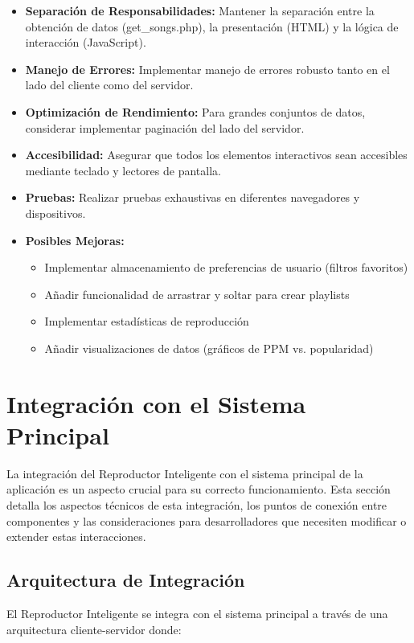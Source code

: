 \documentclass[a4paper,12pt]{article}
\begin{document}
\begin{itemize}
    \item \textbf{Separación de Responsabilidades:} Mantener la separación entre la obtención de datos (get\_songs.php), la presentación (HTML) y la lógica de interacción (JavaScript).
    
    \item \textbf{Manejo de Errores:} Implementar manejo de errores robusto tanto en el lado del cliente como del servidor.
    
    \item \textbf{Optimización de Rendimiento:} Para grandes conjuntos de datos, considerar implementar paginación del lado del servidor.
    
    \item \textbf{Accesibilidad:} Asegurar que todos los elementos interactivos sean accesibles mediante teclado y lectores de pantalla.
    
    \item \textbf{Pruebas:} Realizar pruebas exhaustivas en diferentes navegadores y dispositivos.
    
    \item \textbf{Posibles Mejoras:} 
    \begin{itemize}
        \item Implementar almacenamiento de preferencias de usuario (filtros favoritos)
        \item Añadir funcionalidad de arrastrar y soltar para crear playlists
        \item Implementar estadísticas de reproducción
        \item Añadir visualizaciones de datos (gráficos de PPM vs. popularidad)
    \end{itemize}
\end{itemize}

\section{Integración con el Sistema Principal}
La integración del Reproductor Inteligente con el sistema principal de la aplicación es un aspecto crucial para su correcto funcionamiento. Esta sección detalla los aspectos técnicos de esta integración, los puntos de conexión entre componentes y las consideraciones para desarrolladores que necesiten modificar o extender estas interacciones.

\subsection{Arquitectura de Integración}
El Reproductor Inteligente se integra con el sistema principal a través de una arquitectura cliente-servidor donde:
\end{document}
